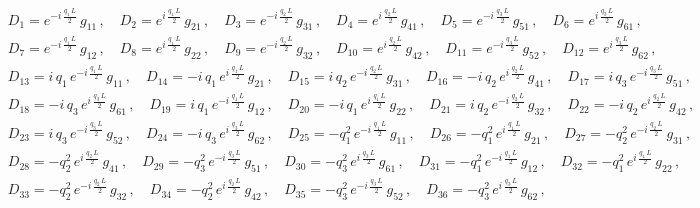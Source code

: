 \documentclass[aps,prb,onecolumn,longbibliography,nofootinbib,citeautoscript,10pt]{revtex4-2}
\def \nn{\nonumber \\}
\def\nn{\nonumber \\}
\def \nn{\nonumber \\}
\begin{document}
\begin{align}
& D_1  = e^{- i \, \frac{ q_1 \, L} {2}} \, g_{11} \,, \quad
  D_2=e^{ i \, \frac{ q_1 \, L} {2}} \, g_{21} \,,  \quad 
 D_3  = e^{- i \, \frac{ q_2 \, L} {2}} \, g_{31} \,, \quad  D_4 
  = e^{ i \, \frac{ q_2 \, L} {2}} \, g_{41} \,, 
\quad D_5  = e^{- i \, \frac{ q_3 \, L} {2}} \, g_{51} \,,  \quad
   D_6  = e^{ i \, \frac{ q_3 \, L} {2}} \, g_{61} \,, \nn &
D_7  = e^{- i \, \frac{ q_1 \, L} {2}} \, g_{12} \,,  
\quad D_8  = e^{ i \, \frac{ q_1 \, L} {2}} \, g_{22} \,,  \quad 
D_9  = e^{- i \, \frac{ q_2 \, L} {2}} \, g_{32} \,,  
\quad D_{10}  = e^{ i \, \frac{ q_2 \, L} {2}} \, g_{42} \,,  \quad 
D_{11}  = e^{- i \, \frac{ q_3 \, L} {2}} \, g_{52} \,,  \quad
 D_{12}  = e^{ i \, \frac{ q_3 \, L} {2}} \, g_{62} \,, \nn &
D_{13}  =  i \, q_1 \, e^{- i \, \frac{ q_1 \, L} {2}} \, g_{11} \,,  \quad
 D_{14}  = - i \, q_1 \, e^{ i \, \frac{ q_1 \, L} {2}} \, g_{21} \,,  
 \quad D_{15}  =  i \, q_2 \, e^{- i \, \frac{ q_2 \, L} {2}} \, g_{31} \,,  \quad
  D_{16}  = - i \, q_2 \, e^{ i \, \frac{ q_2 \, L} {2}} \, g_{41} \,,  \quad 
  D_{17}  =  i \, q_3 \, e^{- i \, \frac{ q_3 \, L} {2}} \, g_{51} \,,  \nn & 
  D_{18}  = - i \, q_3 \, e^{ i \, \frac{ q_3 \, L} {2}} \, g_{61} \,, \quad
D_{19}  =  i \, q_1 \, e^{- i \, \frac{ q_1 \, L} {2}} \, g_{12} \,,  \quad 
D_{20}  = - i \, q_1 \, e^{ i \, \frac{ q_1 \, L} {2}} \, g_{22} \,,  \quad
 D_{21} =  i \, q_2 \, e^{- i \, \frac{ q_2 \, L} {2}} \, g_{32} \,,  
 \quad D_{22}  = - i \, q_2 \, e^{ i \, \frac{ q_2 \, L} {2}} \, g_{42} \,,  
\nn & D_{23}  =  i \, q_3 \, e^{- i \, \frac{ q_3 \, L} {2}} \, g_{52} \,,  
\quad D_{24}  = - i \, q_3 \, e^{ i \, \frac{ q_3 \, L} {2}} \, g_{62} \,, \quad
D_{25}  = -q_1^2\, e^{- i \, \frac{ q_1 \, L} {2}} \, g_{11} \,,  \quad
 D_{26}  = -q_1^2\, e^{ i \, \frac{ q_1 \, L} {2}} \, g_{21} \,,  \quad
  D_{27}  = -q_2^2\, e^{- i \, \frac{ q_2 \, L} {2}} \, g_{31} \,, \nn &
 D_{28}  = -q_2^2\, e^{ i \, \frac{ q_2 \, L} {2}} \, g_{41} \,,   
 \quad D_{29}  = -q_3^2\, e^{- i \, \frac{ q_3 \, L} {2}} \, g_{51} \,,  \quad D_{30}  = -q_3^2\, e^{ i \, \frac{ q_3 \, L} {2}} \, g_{61} \,, \quad
D_{31}  = -q_1^2\, e^{- i \, \frac{ q_1 \, L} {2}} \, g_{12} \,,  
\quad D_{32}  = -q_1^2\, e^{ i \, \frac{ q_1 \, L} {2}} \, g_{22} \,,  \nn &
 D_{33}  = -q_2^2\, e^{- i \, \frac{ q_2 \, L} {2}} \, g_{32} \,, \quad
  D_{34}  = -q_2^2\, e^{ i \, \frac{ q_2 \, L} {2}} \, g_{42} \,,  
  \quad  D_{35}  = -q_3^2\, e^{- i \, \frac{ q_3 \, L} {2}} \, g_{52} \,,  
  \quad D_{36}  = -q_3^2\, e^{ i \, \frac{ q_3 \, L} {2}} \, g_{62}\,,
\end{align}
\end{document}
